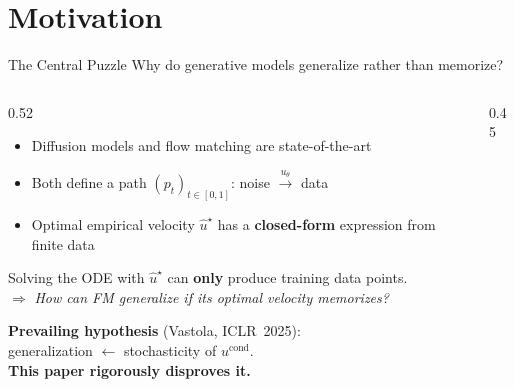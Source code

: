\documentclass[10pt,aspectratio=169]{beamer}
\newcommand{\cN}{\mathcal{N}}
\newcommand{\Id}{\mathrm{Id}}
\begin{document}
\section{Motivation}
\begin{frame}{The Central Puzzle}
  {Why do generative models generalize rather than memorize?}

  \begin{columns}[c]
    \begin{column}{0.52\textwidth}
      \begin{itemize}
        \item Diffusion models and flow matching are state-of-the-art
        \item Both define a path $(p_t)_{t\in[0,1]}$:
          noise $\xrightarrow{u_\theta}$ data
        \item Optimal empirical velocity $\hat{u}^\star$ has a
          \textbf{closed-form} expression from finite data
      \end{itemize}

      \vspace{0.5em}
      \begin{hlbox}[title=Central paradox]
        \small Solving the ODE with $\hat{u}^\star$ can
        \textbf{only} produce training data points.\\[3pt]
        $\Rightarrow$ \emph{How can FM generalize if its
        optimal velocity memorizes?}
      \end{hlbox}

      \vspace{0.4em}
      \textbf{Prevailing hypothesis} (Vastola, ICLR~2025):\\
      generalization $\leftarrow$ stochasticity of $u^{\mathrm{cond}}$.\\[4pt]
      \textcolor{RedKO}{\bfseries This paper rigorously disproves it.}
    \end{column}

    \begin{column}{0.45\textwidth}
\end{column}
\end{columns}
\end{frame}
\end{document}
